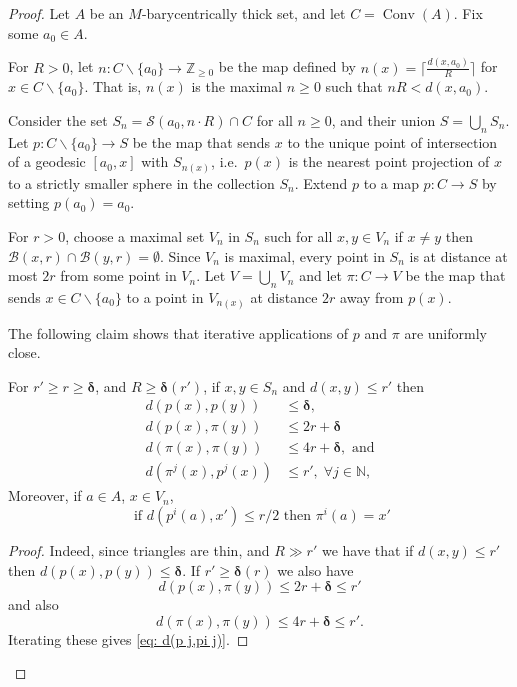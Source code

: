 \documentclass[10pt,a4paper]{amsart}
\DeclareMathOperator{\conv}{Conv}
\newcommand{\bbN}{\mathbb{N}}
\newcommand{\bbZ}{\mathbb{Z}}
\newcommand{\bdelta}{{\boldsymbol\delta}}
\newcommand{\calB}{\mathcal{B}}
\newcommand{\calS}{\mathcal{S}}
\newcommand{\ssm}{\smallsetminus}
\begin{document}
\begin{proof}
    Let $A$ be an $M$-barycentrically thick set, and let $C = \conv(A)$.
    Fix some $a_0\in A$.
    
    For $R> 0$, let $n:C\ssm\{a_0\} \to \bbZ_{\ge 0}$ be the map defined by $n(x) = \lceil\tfrac{d(x,a_0)}{R}\rceil$ for $x\in C\ssm \{a_0\}$. That is, $n(x)$ is the maximal $n\ge 0$ such that $nR < d(x,a_0)$.

    Consider the set $S_n = \calS(a_0,n\cdot R)\cap C$ for all $n\ge 0$, and their union $S = \bigcup_n S_n$. Let $p:C\ssm\{a_0\}\to S$ be the map that sends $x$ to the unique point of intersection of a geodesic $[a_0,x]$ with $S_{n(x)}$,  i.e.\ $p(x)$ is the nearest point projection of $x$ to a strictly smaller sphere in the collection $S_n$.
    Extend $p$ to a map $p:C\to S$ by setting $p(a_0)=a_0$.

    For $r> 0$, choose a maximal set $V_n$ in $S_n$ such for all $x, y\in V_n$ if $x\ne y$ then $\calB(x,r)\cap \calB(y,r)=\emptyset$.
    Since $V_n$ is maximal, every point in $S_n$ is at distance at most $2r$ from some point in $V_n$.
    Let $V = \bigcup_n V_n$ and let $\pi:C  \to V$ be the map that sends $x\in C\ssm \{a_0\}$ to a point in $V_{n(x)}$ at distance $2r$ away from $p(x)$.

    The following claim shows that iterative applications of $p$ and $\pi$ are uniformly close.

    \begin{claim}\label{claim: distance inequality p pi}
        For $r'\ge r\ge \bdelta$, and $R\ge \bdelta(r')$, if $x,y\in S_n$ and $d(x,y)\le r'$ then 
        \begin{align}
            \label{eq: d(p,p)}d(p(x),p(y)) &\le \bdelta,\\
            \label{eq: d(p,pi)}d(p(x),\pi(y))&\le 2r+\bdelta\\ 
            \label{eq: d(pi,pi)}d(\pi(x),\pi(y))&\le 4r+\bdelta, \text{ and}\\
            \label{eq: d(p j,pi j)} d(\pi^j(x),p^j(x))&\le r',\;  \forall j\in \bbN,
        \end{align}
        Moreover, if $a\in A$, $x\in V_n$,
        \begin{equation}\label{eq: close p implies equal pi}
        \text{ if }d(p^i(a),x')\le r/2 \text{ then } \pi^i(a)=x'
        \end{equation}
    \end{claim}
    \begin{proof} 
        Indeed, since triangles are thin, and $R\gg r'$ we have that if $d(x,y)\le r'$ then $d(p(x),p(y))\le \bdelta$. If $r' \ge \bdelta(r)$ we also have $$d(p(x),\pi(y))\le 2r+\bdelta \le r'$$
        and also 
        \begin{equation*}
            d(\pi(x),\pi(y))\le 4r+\bdelta\le r'. 
        \end{equation*}
        Iterating these gives \eqref{eq: d(p j,pi j)}.
        

\end{proof}
\end{proof}
\end{document}
